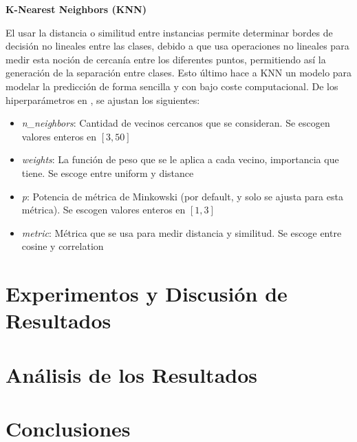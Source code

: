 \documentclass[12pt,a4paper]{article}
\begin{document}
{{            \textbf{K-Nearest Neighbors (KNN)}\\
            {
                El usar la distancia o similitud entre instancias permite determinar bordes de decisión	 
                no lineales entre las clases, debido a que usa operaciones no lineales para medir esta 
                noción de cercanía entre los diferentes puntos, permitiendo así la generación de la 
                separación entre clases. Esto último hace a KNN un modelo para modelar la predicción 
                de forma sencilla y con bajo coste computacional. De los hiperparámetros en \cite{sklearn_knn}, 
                se ajustan los siguientes:
                \begin{itemize}
                    \item \emph{n\_neighbors}: Cantidad de vecinos cercanos que se consideran. Se escogen valores enteros en $[3,50]$
                    \item \emph{weights}: La función de peso que se le aplica a cada vecino, importancia que tiene. Se escoge entre uniform y distance
                    \item \emph{p}: Potencia de métrica de Minkowski (por default, y solo se ajusta para esta métrica). Se escogen valores enteros en $[1,3]$
                    \item \emph{metric}: Métrica que se usa para medir distancia y similitud. Se escoge entre cosine y correlation
                \end{itemize}
            }
        }
    }
    \newpage

    \section{Experimentos y Discusión de Resultados}
    {}
    \newpage

    \section{Análisis de los Resultados}
    {}
    \newpage

    \section{Conclusiones}
    {}
    \newpage

    \printbibliography[heading=bibintoc,title={Referencias Bibliográficas}]
\end{document}

